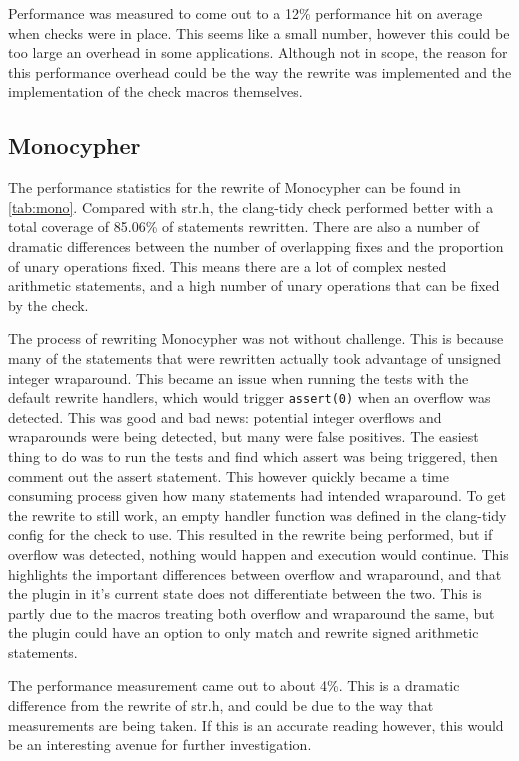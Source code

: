 Performance was measured to come out to a 12\% performance hit on average when checks were in place. This seems like a small number, however this could be too large an overhead in some applications. Although not in scope, the reason for this performance overhead could be the way the rewrite was implemented and the implementation of the check macros themselves.

\subsection{Monocypher}

The performance statistics for the rewrite of Monocypher can be found in \ref{tab:mono}. Compared with str.h, the clang-tidy check performed better with a total coverage of 85.06\% of statements rewritten. There are also a number of dramatic differences between the number of overlapping fixes and the proportion of unary operations fixed. This means there are a lot of complex nested arithmetic statements, and a high number of unary operations that can be fixed by the check.

The process of rewriting Monocypher was not without challenge. This is because many of the statements that were rewritten actually took advantage of unsigned integer wraparound. This became an issue when running the tests with the default rewrite handlers, which would trigger \texttt{assert(0)} when an overflow was detected. This was good and bad news: potential integer overflows and wraparounds were being detected, but many were false positives. The easiest thing to do was to run the tests and find which assert was being triggered, then comment out the assert statement. This however quickly became a time consuming process given how many statements had intended wraparound. To get the rewrite to still work, an empty handler function was defined in the clang-tidy config for the check to use. This resulted in the rewrite being performed, but if overflow was detected, nothing would happen and execution would continue. This highlights the important differences between overflow and wraparound, and that the plugin in it's current state does not differentiate between the two. This is partly due to the macros treating both overflow and wraparound the same, but the plugin could have an option to only match and rewrite signed arithmetic statements.

The performance measurement came out to about 4\%. This is a dramatic difference from the rewrite of str.h, and could be due to the way that measurements are being taken. If this is an accurate reading however, this would be an interesting avenue for further investigation.

